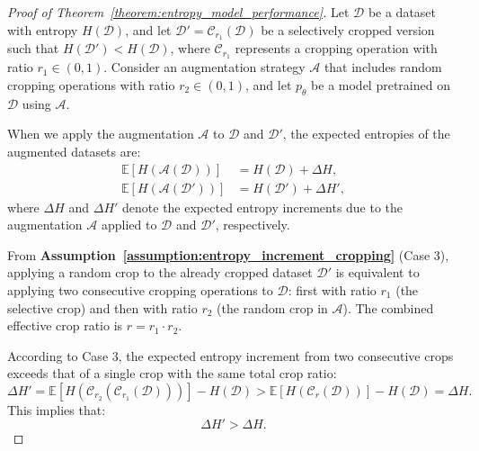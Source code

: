 \begin{proof}[Proof of Theorem~\ref{theorem:entropy_model_performance}]
Let $\mathcal{D}$ be a dataset with entropy $H(\mathcal{D})$, and let $\mathcal{D}' = \mathcal{C}_{r_1}(\mathcal{D})$ be a selectively cropped version such that $H(\mathcal{D}') < H(\mathcal{D})$, where $\mathcal{C}_{r_1}$ represents a cropping operation with ratio $r_1 \in (0, 1)$. Consider an augmentation strategy $\mathcal{A}$ that includes random cropping operations with ratio $r_2 \in (0, 1)$, and let $p_\theta$ be a model pretrained on $\mathcal{D}$ using $\mathcal{A}$.

When we apply the augmentation $\mathcal{A}$ to $\mathcal{D}$ and $\mathcal{D}'$, the expected entropies of the augmented datasets are:
\begin{align*}
\mathbb{E}\left[ H\left( \mathcal{A}(\mathcal{D}) \right) \right] & = H(\mathcal{D}) + \Delta H, \\
\mathbb{E}\left[ H\left( \mathcal{A}(\mathcal{D}') \right) \right] & = H(\mathcal{D}') + \Delta H',
\end{align*}
where $\Delta H$ and $\Delta H'$ denote the expected entropy increments due to the augmentation $\mathcal{A}$ applied to $\mathcal{D}$ and $\mathcal{D}'$, respectively.

From \textbf{Assumption~\ref{assumption:entropy_increment_cropping}} (Case 3), applying a random crop to the already cropped dataset $\mathcal{D}'$ is equivalent to applying two consecutive cropping operations to $\mathcal{D}$: first with ratio $r_1$ (the selective crop) and then with ratio $r_2$ (the random crop in $\mathcal{A}$). The combined effective crop ratio is $r = r_1 \cdot r_2$.

According to Case 3, the expected entropy increment from two consecutive crops exceeds that of a single crop with the same total crop ratio:
\[
\Delta H' = \mathbb{E}\left[ H\left( \mathcal{C}_{r_2}\left( \mathcal{C}_{r_1}(\mathcal{D}) \right) \right) \right] - H(\mathcal{D}) > \mathbb{E}\left[ H\left( \mathcal{C}_{r}(\mathcal{D}) \right) \right] - H(\mathcal{D}) = \Delta H.
\]
This implies that:
\[
\Delta H' > \Delta H.
\]


\end{proof}
